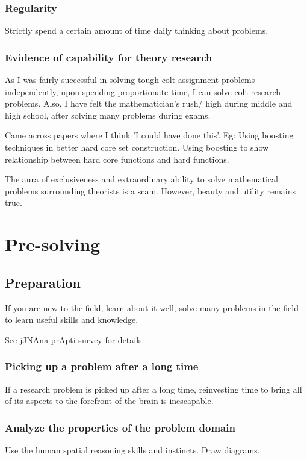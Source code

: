 \documentclass[oneside, article]{memoir}
\begin{document}
\subsection{Regularity}
Strictly spend a certain amount of time daily thinking about problems.

\subsection{Evidence of capability for theory research}
As I was fairly successful in solving tough colt assignment problems independently, upon spending proportionate time, I can solve colt research problems. Also, I have felt the mathematician's rush/ high during middle and high school, after solving many problems during exams.

Came across papers where I think 'I could have done this'. Eg: Using boosting techniques in better hard core set construction. Using boosting to show relationship between hard core functions and hard functions.

The aura of exclusiveness and extraordinary ability to solve mathematical problems surrounding theorists is a scam. However, beauty and utility remains true.

\chapter{Pre-solving}
\section{Preparation}
If you are new to the field, learn about it well, solve many problems in the field to learn useful skills and knowledge.

See jJNAna-prApti survey for details.

\subsection{Picking up a problem after a long time}
If a research problem is picked up after a long time, reinvesting time to bring all of its aspects to the forefront of the brain is inescapable.

\subsection{Analyze the properties of the problem domain}
Use the human spatial reasoning skills and instincts. Draw diagrams.
\end{document}
